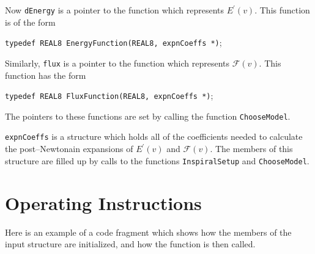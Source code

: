 \documentclass[12pt]{article}
\begin{document}
\vspace{5mm}

Now \texttt{dEnergy} is a pointer to the function which represents $E^{\prime}(v)$. This function is of the form

\vspace{5mm}

\texttt{typedef REAL8 EnergyFunction(REAL8, expnCoeffs *)};

\vspace{5mm}

Similarly, \texttt{flux} is a pointer to the function which represents $\mathcal{F}(v)$. This function has the form

\vspace{5mm}

\texttt{typedef REAL8 FluxFunction(REAL8, expnCoeffs *)};

\vspace{5mm}

The pointers to these functions are set by calling the function \texttt{ChooseModel}.

\texttt{expnCoeffs} is a structure which holds all of the coefficients needed to calculate the post--Newtonain expansions of $E^{\prime}(v)$ and $\mathcal{F}(v)$. The members of this structure are filled up by calls to the functions \texttt{InspiralSetup} and \texttt{ChooseModel}.








\section{Operating Instructions}

Here is an example of a code fragment which shows how the members of the input structure are initialized, and how the function is then called.

\vspace{5mm}
\end{document}
